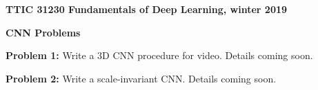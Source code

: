 \documentclass{article}
\begin{document}
\centerline{\bf TTIC 31230 Fundamentals of Deep Learning, winter 2019}
\centerline{\bf CNN Problems}

\bigskip
{\bf Problem 1:} Write a 3D CNN procedure for video. Details coming soon.

\bigskip
{\bf Problem 2:} Write a scale-invariant CNN.  Details coming soon.
\end{document}
